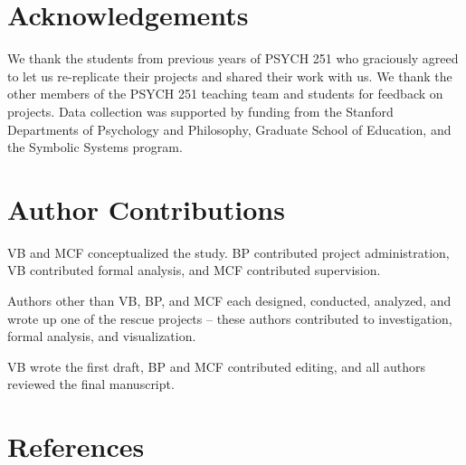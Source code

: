 \documentclass[
  english,
  a4paper,
]{article}
\begin{document}
\section*{Acknowledgements}\label{acknowledgements}

We thank the students from previous years of PSYCH 251 who graciously agreed to let us re-replicate their projects and shared their work with us.
We thank the other members of the PSYCH 251 teaching team and students for feedback on projects.
Data collection was supported by funding from the Stanford Departments of Psychology and Philosophy, Graduate School of Education, and the Symbolic Systems program.

\section*{Author Contributions}\label{author-contributions}

VB and MCF conceptualized the study.
BP contributed project administration, VB contributed formal analysis, and MCF contributed supervision.

Authors other than VB, BP, and MCF each designed, conducted, analyzed, and wrote up one of the rescue projects -- these authors contributed to investigation, formal analysis, and visualization.

VB wrote the first draft, BP and MCF contributed editing, and all authors reviewed the final manuscript.

\section*{References}\label{references}
\end{document}
